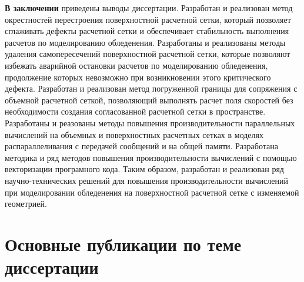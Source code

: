 \documentclass[a4paper,14pt]{extarticle}                     %
\theoremstyle{plain}                                         %
\begin{document}

\textbf{В заключении} приведены выводы диссертации.
Разработан и реализован метод окрестностей перестроения поверхностной расчетной сетки, который позволяет сглаживать дефекты расчетной сетки и обеспечивает стабильность выполнения расчетов по моделированию обледенения.
Разработаны и реализованы методы удаления самопересечений поверхностной расчетной сетки, которые позволяют избежать аварийной остановки расчетов по моделированию обледенения, продолжение которых невозможно при возникновении этого критического дефекта.
Разработан и реализован метод погруженной границы для сопряжения с объемной расчетной сеткой, позволяющий выполнять расчет поля скоростей без необходимости создания согласованной расчетной сетки в пространстве.
Разработаны и реазованы методы повышения производительности параллельных вычислений на объемных и поверхностных расчетных сетках в моделях распараллеливания с передачей сообщений и на общей памяти.
Разработана методика и ряд методов повышения производительности вычислений с помощью векторизации програмного кода.
Таким образом, разработан и реализован ряд научно-технических решений для повышения производительности вычислений при моделировании обледенения на поверхностной расчетной сетке с изменяемой геометрией.

\section*{Основные публикации по теме диссертации}
\end{document}
